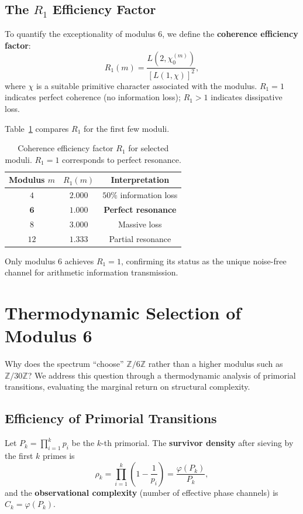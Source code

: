 \documentclass[12pt,a4paper]{article}
\theoremstyle{plain}
\theoremstyle{definition}
\theoremstyle{remark}
\begin{document}
\subsection{The $R_1$ Efficiency Factor}
To quantify the exceptionality of modulus $6$, we define the \textbf{coherence efficiency factor}:
\begin{equation}
R_1(m) = \frac{L(2, \chi_0^{(m)})}{[L(1, \chi)]^2},
\label{eq:R1}
\end{equation}
where $\chi$ is a suitable primitive character associated with the modulus. $R_1 = 1$ indicates perfect coherence (no information loss); $R_1 > 1$ indicates dissipative loss.

Table~\ref{tab:R1} compares $R_1$ for the first few moduli.

\begin{table}[H]
\centering
\caption{Coherence efficiency factor $R_1$ for selected moduli. $R_1 = 1$ corresponds to perfect resonance.}
\label{tab:R1}
\begin{tabular}{@{}ccc@{}}
\toprule
\textbf{Modulus $m$} & \textbf{$R_1(m)$} & \textbf{Interpretation} \\
\midrule
$4$  & $2.000$ & $50\%$ information loss \\
$\mathbf{6}$  & $\mathbf{1.000}$ & \textbf{Perfect resonance} \\
$8$  & $3.000$ & Massive loss \\
$12$ & $1.333$ & Partial resonance \\
\bottomrule
\end{tabular}
\end{table}

Only modulus $6$ achieves $R_1 = 1$, confirming its status as the unique noise-free channel for arithmetic information transmission.

\section{Thermodynamic Selection of Modulus 6}
\label{sec:thermodynamic}

Why does the spectrum ``choose'' $\mathbb{Z}/6\mathbb{Z}$ rather than a higher modulus such as $\mathbb{Z}/30\mathbb{Z}$? We address this question through a thermodynamic analysis of primorial transitions, evaluating the marginal return on structural complexity.

\subsection{Efficiency of Primorial Transitions}
Let $P_k = \prod_{i=1}^{k} p_i$ be the $k$-th primorial. The \textbf{survivor density} after sieving by the first $k$ primes is
\begin{equation}
\rho_k = \prod_{i=1}^{k} \left(1 - \frac{1}{p_i}\right) = \frac{\varphi(P_k)}{P_k},
\label{eq:rho}
\end{equation}
and the \textbf{observational complexity} (number of effective phase channels) is $C_k = \varphi(P_k)$.
\end{document}
